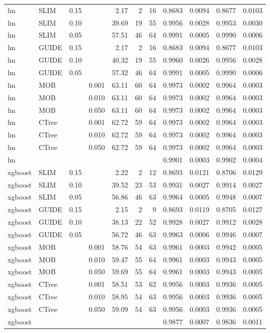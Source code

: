 \begin{table}
\begin{tabular}[t]{l|l|r|r|r|r|r|r|r|r|r}
\hline
lm & SLIM & 0.15 & & 2.17 & 2 & 16 & 0.8683 & 0.0094 & 0.8677 & 0.0103\\
lm & SLIM & 0.10 & & 39.69 & 19 & 55 & 0.9956 & 0.0028 & 0.9953 & 0.0030\\
lm & SLIM & 0.05 & & 57.51 & 46 & 64 & 0.9991 & 0.0005 & 0.9990 & 0.0006\\
lm & GUIDE & 0.15 & & 2.17 & 2 & 16 & 0.8683 & 0.0094 & 0.8677 & 0.0103\\
lm & GUIDE & 0.10 & & 40.32 & 19 & 55 & 0.9960 & 0.0026 & 0.9956 & 0.0028\\
lm & GUIDE & 0.05 & & 57.32 & 46 & 64 & 0.9991 & 0.0005 & 0.9990 & 0.0006\\
lm & MOB & & 0.001 & 63.11 & 60 & 64 & 0.9973 & 0.0002 & 0.9964 & 0.0003\\
lm & MOB & & 0.010 & 63.11 & 60 & 64 & 0.9973 & 0.0002 & 0.9964 & 0.0003\\
lm & MOB & & 0.050 & 63.11 & 60 & 64 & 0.9973 & 0.0002 & 0.9964 & 0.0003\\
lm & CTree & & 0.001 & 62.72 & 59 & 64 & 0.9973 & 0.0002 & 0.9964 & 0.0003\\
lm & CTree & & 0.010 & 62.72 & 59 & 64 & 0.9973 & 0.0002 & 0.9964 & 0.0003\\
lm & CTree & & 0.050 & 62.72 & 59 & 64 & 0.9973 & 0.0002 & 0.9964 & 0.0003\\
\hline
lm & & & & & & & 0.9901 & 0.0003 & 0.9902 & 0.0004\\
\hline


\hline
xgboost & SLIM & 0.15 & & 2.22 & 2 & 12 & 0.8693 & 0.0121 & 0.8706 & 0.0129\\
xgboost & SLIM & 0.10 & & 39.52 & 23 & 53 & 0.9931 & 0.0027 & 0.9914 & 0.0027\\
xgboost & SLIM & 0.05 & & 56.86 & 46 & 63 & 0.9964 & 0.0005 & 0.9948 & 0.0007\\
xgboost & GUIDE & 0.15 & & 2.15 & 2 & 9 & 0.8693 & 0.0119 & 0.8705 & 0.0127\\
xgboost & GUIDE & 0.10 & & 38.13 & 22 & 52 & 0.9928 & 0.0027 & 0.9912 & 0.0028\\
xgboost & GUIDE & 0.05 & & 56.72 & 46 & 63 & 0.9963 & 0.0006 & 0.9946 & 0.0007\\
xgboost & MOB & & 0.001 & 58.76 & 54 & 63 & 0.9961 & 0.0003 & 0.9942 & 0.0005\\
xgboost & MOB & & 0.010 & 59.47 & 55 & 64 & 0.9961 & 0.0003 & 0.9943 & 0.0005\\
xgboost & MOB & & 0.050 & 59.69 & 55 & 64 & 0.9961 & 0.0003 & 0.9943 & 0.0005\\
xgboost & CTree & & 0.001 & 58.51 & 53 & 62 & 0.9956 & 0.0003 & 0.9936 & 0.0005\\
xgboost & CTree & & 0.010 & 58.95 & 54 & 63 & 0.9956 & 0.0003 & 0.9936 & 0.0005\\
xgboost & CTree & & 0.050 & 59.09 & 54 & 63 & 0.9956 & 0.0003 & 0.9936 & 0.0005\\
\hline
xgboost & & & & & & & 0.9877 & 0.0007 & 0.9836 & 0.0011\\
\hline


\end{tabular}
\end{table}

